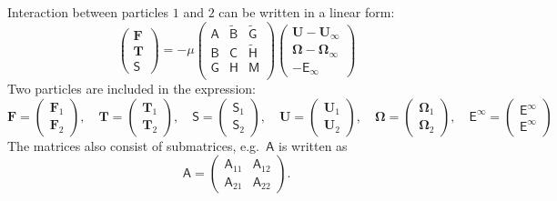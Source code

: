 \documentclass[12pt]{article}
\newcommand{\tens}[1]{\bm{\mathsf{#1}}}
\begin{document}
Interaction between particles $1$ and $2$
can be written in a linear form:
\begin{equation}
 \begin{pmatrix}
  \bm{F} \\ \bm{T} \\ \tens{S}
 \end{pmatrix}
 =
- \mu
\begin{pmatrix}
 \tens{A} &  \tilde{\tens{B}} &  \tilde{\tens{G}} \\
 \tens{B} &  \tens{C} &  \tilde{\tens{H}} \\
 \tens{G} &  \tens{H} &  \tens{M} \\
\end{pmatrix}
 \begin{pmatrix}
  \bm{U}-\bm{U}_{\infty} \\ \bm{\Omega} - \bm{\Omega}_{\infty}
 \\ -\tens{E}_{\infty}
 \end{pmatrix}
\end{equation}
Two particles are included in the expression:
\begin{equation}
 \bm{F}
= 
\begin{pmatrix}
 \bm{F}_1 \\  \bm{F}_2
\end{pmatrix}
,\quad
 \bm{T}
= 
\begin{pmatrix}
 \bm{T}_1 \\  \bm{T}_2
\end{pmatrix}
,\quad
 \tens{S}
= 
\begin{pmatrix}
 \tens{S}_1 \\  \tens{S}_2
\end{pmatrix}
,\quad
 \bm{U}
= 
\begin{pmatrix}
 \bm{U}_1 \\  \bm{U}_2
\end{pmatrix}
,\quad
 \bm{\Omega}
= 
\begin{pmatrix}
 \bm{\Omega}_1 \\  \bm{\Omega}_2
\end{pmatrix}
,\quad
 \tens{E}^{\infty}
= 
\begin{pmatrix}
  \tens{E}^{\infty} \\   \tens{E}^{\infty}
\end{pmatrix}
\end{equation}
The matrices also consist of submatrices,
e.g.~$\tens{A}$ is written as
\begin{equation}
 \tens{A}
 =
\begin{pmatrix}
  \tens{A}_{11} & \tens{A}_{12} \\
  \tens{A}_{21} & \tens{A}_{22} 
\end{pmatrix}.
\end{equation}
%
\end{document}
